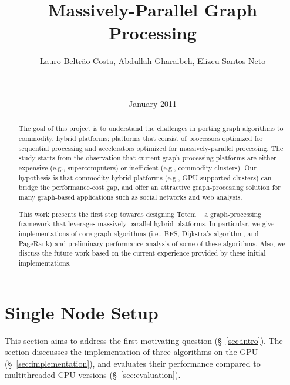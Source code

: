 \documentclass{acm_proc_article-sp}[12pt]
\title{Massively-Parallel Graph Processing}
\author{
\alignauthor 
Lauro Beltr\~ao Costa, Abdullah Gharaibeh, Elizeu
Santos-Neto\vspace{3mm}\\
       \affaddr{\small{University of British Columbia}}\\
       \affaddr{\small{2332 Main Mall, Vancouver, BC, CANADA}}\\
       \email{\small{\{lauroc,abdullah,elizeus\}@ece.ubc.ca}}
}
\date{ January 2011}
\newcommand{\comment}[2]{\begin{center}\colorbox{#1}{\parbox{0.85\linewidth}{\textit{{#2}}}}\end{center}}
\newcommand{\abdullah}[1]{\comment{orange}{{Abdullah: #1}}}
\newcommand{\lauro}[1]{\comment{midblue}{{Lauro: #1}}}
\newcommand{\elizeu}[1]{\comment{lightgreen}{{Elizeu: #1}}}
\begin{document}
\maketitle


\begin{abstract}
The goal of this project is to understand the challenges in porting graph algorithms to commodity, hybrid platforms; platforms that consist of processors optimized for sequential processing and accelerators optimized for massively-parallel processing. The study starts from the observation that current graph processing platforms are either expensive (e.g., supercomputers) or inefficient (e.g., commodity clusters). Our hypothesis is that commodity hybrid platforms (e.g., GPU-supported clusters) can bridge the performance-cost gap, and offer an attractive graph-processing solution for many graph-based applications such as social networks and web analysis.

This work presents the first step towards designing {\sc Totem} -- a graph-processing framework that leverages massively parallel hybrid platforms. In particular, we give implementations of core graph algorithms (i.e., BFS, Dijkstra's algorithm, and PageRank) and preliminary performance analysis of some of these algorithms. Also, we discuss the future work based on the current experience provided by these initial implementations.
\end{abstract}







\section{Single Node Setup}
\label{sec:single}

This section aims to address the first motivating question (\S~\ref{sec:intro}). The section disccusses the implementation of three algorithms on the GPU (\S~\ref{sec:implementation}), and evaluates their performance compared to multithreaded CPU versions (\S~\ref{sec:evaluation}).
\end{document}
